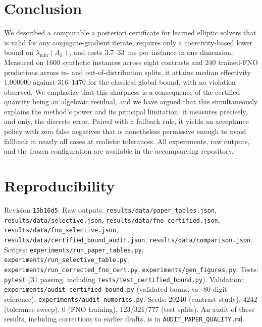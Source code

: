 \documentclass[journal]{IEEEtran}
\theoremstyle{plain}
\theoremstyle{definition}
\begin{document}
\section{Conclusion}
We described a computable a posteriori certificate for learned elliptic solvers that is
valid for any conjugate-gradient iterate, requires only a coercivity-based lower bound on
$\lambda_{\min}(A_h)$, and costs 3.7--33~ms per instance in one dimension. Measured on
$1600$ synthetic instances across eight contrasts and $240$ trained-FNO predictions
across in- and out-of-distribution splits, it attains median effectivity $1.000000$
against $316$--$1470$ for the classical global bound, with no violation observed. We
emphasize that this sharpness is a consequence of the certified quantity being an
algebraic residual, and we have argued that this simultaneously explains the
method's power and its principal limitation: it measures precisely, and only, the
discrete error. Paired with a fallback rule, it yields an acceptance policy with zero
false negatives that is nonetheless permissive enough to avoid fallback in nearly all
cases at realistic tolerances. All experiments, raw outputs, and the frozen
configuration are available in the accompanying repository.

\section*{Reproducibility}\label{sec:repro}
Revision \texttt{15b16d5}. Raw outputs: \texttt{results/data/paper\_tables.json},
\texttt{results/data/selective.json}, \texttt{results/data/fno\_certified.json}, \texttt{results/data/fno\_selective.json}, \texttt{results/data/certified\_bound\_audit.json},
\texttt{results/data/comparison.json}. Scripts:
\texttt{experiments/run\_paper\_tables.py}, \texttt{experiments/run\_selective\_table.py},
\texttt{experiments/run\_corrected\_fno\_cert.py}, \texttt{experiments/gen\_figures.py}.
Tests: \texttt{pytest} (31 passing, including \texttt{tests/test\_certified\_bound.py}). Validation: \texttt{experiments/audit\_certified\_bound.py} (validated bound vs.\ $80$-digit reference), \texttt{experiments/audit\_numerics.py}. Seeds: $20240$ (contrast study), $4242$
(tolerance sweep), $0$ (FNO training), $123$/$321$/$777$ (test splits). An audit of
these results, including corrections to earlier drafts, is in
\texttt{AUDIT\_PAPER\_QUALITY.md}.



\end{document}
